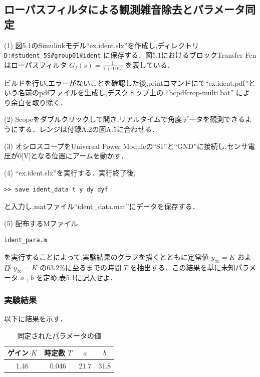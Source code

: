 \subsection{ローパスフィルタによる観測雑音除去とパラメータ同定}

(1) 図5.1のSimulinkモデル“ex.ident.slx”を作成し,ディレクトリ \texttt{D:\#student\_5S\#group01\#ident} に保存する．図5.1におけるブロックTransfer Fcnはローパスフィルタ \( G_f(s) = \frac{1}{1 + 0.01s} \) を表している．

ビルドを行い,エラーがないことを確認した後,printコマンドにて“ex.ident.pdf”という名前のpdfファイルを生成し,デスクトップ上の “bcpdfcrop-multi.bat” により余白を取り除く．

(2) Scopeをダブルクリックして開き,リアルタイムで角度データを観測できるようにする．レンジは付録A.2の図A.5に合わせる．

(3) オシロスコープをUniversal Power Moduleの“S1”と“GND”に接続し,センサ電圧が0[V]となる位置にアームを動かす．

(4) “ex.ident.slx”を実行する．実行終了後,
\begin{verbatim}
>> save ident_data t y dy dyf
\end{verbatim}
と入力し,matファイル“ident\_data.mat”にデータを保存する．

(5) 配布するMファイル
\begin{verbatim}
ident_para.m
\end{verbatim}
を実行することによって,実験結果のグラフを描くとともに定常値 \( y_{\infty} = K \) および \( y_{\infty} = K \) の63.2\%に至るまでの時間 \( T \) を抽出する．この結果を基に未知パラメータ \( a \) , \( b \) を定め,表5.1に記入せよ．


\subsubsection{実験結果}
以下に結果を示す．

\begin{table}[h]
  \centering
  \caption{同定されたパラメータの値}
  \begin{tabular}{|c|c|c|c|}
    \hline
    ゲイン \( K \) & 時定数 \( T \) & \( a \) & \( b \) \\ \hline
    1.46           & 0.046          & 21.7    & 31.8    \\ \hline
  \end{tabular}
\end{table}

